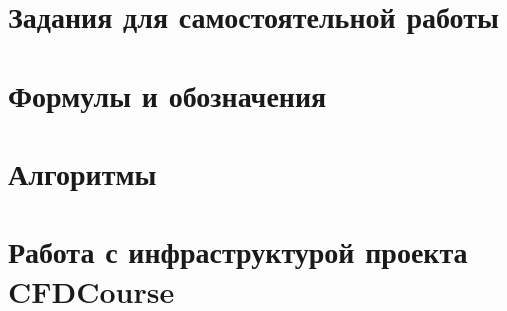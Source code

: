 \documentclass[a4paper,12pt]{article}
\numberwithin{equation}{section}
\begin{document}
\newpage
\tableofcontents
\newpage




\appendix
\section{Задания для самостоятельной работы}

\section{Формулы и обозначения}




\section{Алгоритмы}



\section{Работа с инфраструктурой проекта CFDCourse}




\end{document}
